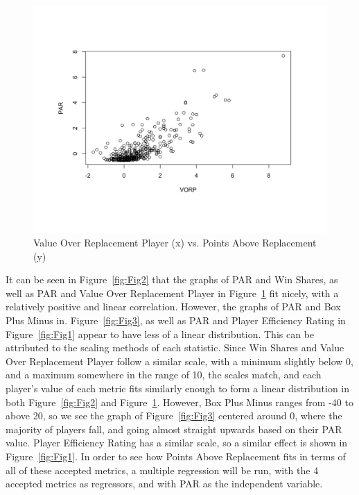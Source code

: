 \documentclass[12pt]{article}
\begin{document}
\begin{figure}[H]
  \centering
  \includegraphics[width=\textwidth]{VORPvsPAR}
  \caption{Value Over Replacement Player (x) vs. Points Above Replacement (y)}
  \label{fig:Fig4}
\end{figure}

It can be seen in Figure~\ref{fig:Fig2} that the graphs of PAR and Win 
Shares, as 
well as PAR 
and Value Over Replacement Player in Figure~\ref{fig:Fig4}
fit nicely, with a relatively positive and linear correlation. However, the 
graphs of PAR and Box Plus Minus in. Figure~\ref{fig:Fig3}, 
as well as PAR and Player Efficiency Rating in Figure~\ref{fig:Fig1} 
appear to 
have less of a 
linear distribution. This can be 
attributed to the scaling methods of each statistic. Since Win Shares and 
Value Over Replacement Player 
follow a similar scale, with a minimum slightly below 0, and a maximum 
somewhere in the range of 10, the 
scales match, and each player's value of each metric fits similarly enough 
to form a linear distribution in both Figure~\ref{fig:Fig2} and 
Figure~\ref{fig:Fig4}. 
However, Box Plus Minus ranges from -40 to above 20, so we see the 
graph of Figure~\ref{fig:Fig3} centered around 0, where the 
majority of players fall, and going almost straight upwards based on their 
PAR value. Player Efficiency 
Rating has a similar scale, so a similar effect is shown in 
Figure~\ref{fig:Fig1}. In 
order to see 
how Points Above Replacement fits 
in terms of all of these accepted metrics, a multiple regression will be run, 
with the 4 accepted metrics as 
regressors, and with PAR as the independent variable.
\end{document}

